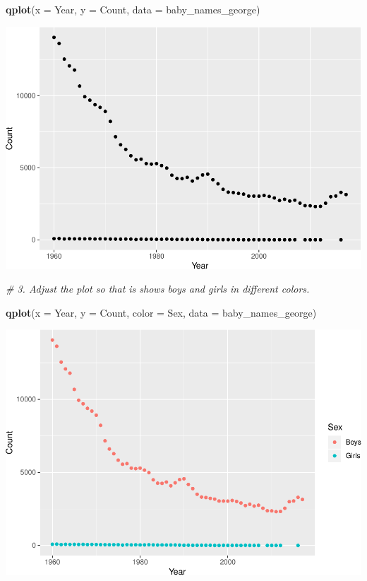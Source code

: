 \documentclass[]{book}
\newenvironment{Shaded}{\begin{snugshade}}{\end{snugshade}}
\newcommand{\CommentTok}[1]{\textcolor[rgb]{0.56,0.35,0.01}{\textit{#1}}}
\newcommand{\DataTypeTok}[1]{\textcolor[rgb]{0.13,0.29,0.53}{#1}}
\newcommand{\KeywordTok}[1]{\textcolor[rgb]{0.13,0.29,0.53}{\textbf{#1}}}
\newcommand{\NormalTok}[1]{#1}
\begin{document}
\begin{Shaded}
\begin{Highlighting}[]
\KeywordTok{qplot}\NormalTok{(}\DataTypeTok{x =}\NormalTok{ Year, }\DataTypeTok{y =}\NormalTok{ Count, }\DataTypeTok{data =}\NormalTok{ baby_names_george)}
\end{Highlighting}
\end{Shaded}

\includegraphics{R/Rintro/figures/unnamed-chunk-70-1.pdf}

\begin{Shaded}
\begin{Highlighting}[]
\CommentTok{# 3. Adjust the plot so that is shows boys and girls in different colors.}
\end{Highlighting}
\end{Shaded}

\begin{Shaded}
\begin{Highlighting}[]
\KeywordTok{qplot}\NormalTok{(}\DataTypeTok{x =}\NormalTok{ Year, }\DataTypeTok{y =}\NormalTok{ Count, }\DataTypeTok{color =}\NormalTok{ Sex, }\DataTypeTok{data =}\NormalTok{ baby_names_george)}
\end{Highlighting}
\end{Shaded}

\includegraphics{R/Rintro/figures/unnamed-chunk-72-1.pdf}
\end{document}
